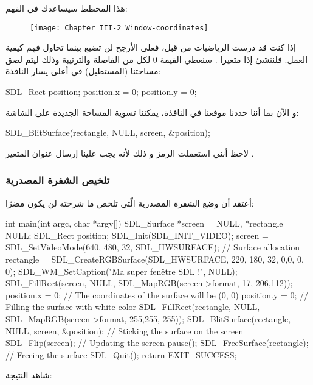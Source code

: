 هذا المخطط سيساعدك في الفهم:

\begin{figure}[H]
	\centering
	\texttt{[image: Chapter\_III-2\_Window-coordinates]}
\end{figure}

إذا كنت قد درست الرياضيات من قبل، فعلى الأرجح لن تضيع بينما تحاول  فهم كيفية العمل. فلننشئ إذا متغيرا 
.
سنعطي القيمة 0 لكل من الفاصلة والترتيبة وذلك ليتم لصق مساحتنا (المستطيل) في أعلى يسار النافذة:

\begin{Csource}
SDL_Rect position;
position.x = 0;
position.y = 0;
\end{Csource}

و الآن بما أننا حددنا موقعنا في النافذة، يمكننا تسوية المساحة الجديدة على الشاشة:

\begin{Csource}
SDL_BlitSurface(rectangle, NULL, screen, &position);
\end{Csource}
 
لاحظ أنني استعملت الرمز
\InlineCode{\&}
و ذلك لأنه يجب علينا إرسال عنوان المتغير
.

\subsubsection{تلخيص الشفرة المصدرية}

أعتقد أن وضع الشفرة المصدرية الّتي تلخص ما شرحته لن يكون مضرًا:

\begin{Csource}
int main(int argc, char *argv[])
{
	SDL_Surface *screen = NULL, *rectangle = NULL;
	SDL_Rect position;
	SDL_Init(SDL_INIT_VIDEO);
	screen = SDL_SetVideoMode(640, 480, 32, SDL_HWSURFACE);
	// Surface allocation
	rectangle = SDL_CreateRGBSurface(SDL_HWSURFACE, 220, 180, 32, 0,0, 0, 0);
	SDL_WM_SetCaption("Ma super fenêtre SDL !", NULL);
	SDL_FillRect(screen, NULL, SDL_MapRGB(screen->format, 17, 206,112));
	position.x = 0; // The coordinates of the surface will be (0, 0)
	position.y = 0;
	// Filling the surface with white color
	SDL_FillRect(rectangle, NULL, SDL_MapRGB(screen->format, 255,255, 255));
	SDL_BlitSurface(rectangle, NULL, screen, &position); // Sticking the surface on the screen 
	SDL_Flip(screen); // Updating the screen
	pause();
	SDL_FreeSurface(rectangle); // Freeing the surface
	SDL_Quit();
	return EXIT_SUCCESS;
}
\end{Csource}

شاهد النتيجة:

